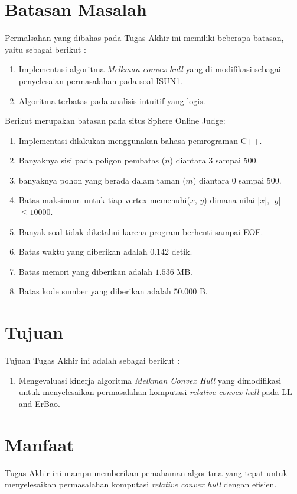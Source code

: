 \section {Batasan Masalah}
\label{sec:batasan_masalah}
Permalsahan yang dibahas pada Tugas Akhir ini memiliki beberapa batasan, yaitu sebagai berikut :
\begin{enumerate}
    \item Implementasi algoritma \textit{Melkman convex hull} yang di modifikasi sebagai penyelesaian permasalahan \RCH pada soal ISUN1.
    \item Algoritma \RCH terbatas pada analisis intuitif yang logis.
\end{enumerate}
Berikut merupakan batasan pada situs Sphere Online Judge: 
\begin {enumerate}
    \item Implementasi dilakukan menggunakan bahasa pemrograman C++.
    \item Banyaknya sisi pada poligon pembatas ($n$) diantara 3 sampai 500.
    \item banyaknya pohon yang berada dalam taman ($m$) diantara 0 sampai 500.
    \item Batas maksimum untuk tiap vertex memenuhi($ x $, $ y $) dimana nilai |$x$|, |$y$| $\leq 10000$. 
    \item Banyak soal tidak diketahui karena program berhenti sampai EOF.
    \item Batas waktu yang diberikan adalah $ 0.142 $ detik.
    \item Batas memori yang diberikan adalah $ 1.536 $ MB.
    \item Batas kode sumber yang diberikan adalah $ 50.000 $ B. 
\end {enumerate}

\section {Tujuan}
Tujuan Tugas Akhir ini adalah sebagai berikut :
\begin{enumerate}
    \item Mengevaluasi kinerja algoritma \textit{Melkman Convex Hull} yang dimodifikasi untuk menyelesaikan permasalahan komputasi \textit{relative convex hull} pada LL and ErBao.
\end{enumerate}

\section {Manfaat}
Tugas Akhir ini mampu memberikan pemahaman algoritma yang tepat untuk menyelesaikan permasalahan komputasi \textit{relative convex hull} dengan efisien.

